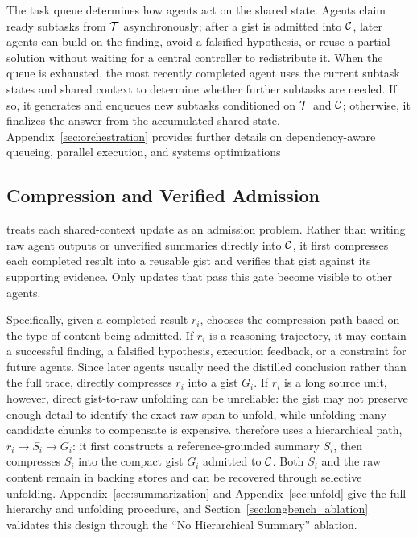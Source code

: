 The task queue determines how agents act on the shared state. Agents claim ready subtasks from $\mathcal{T}$ asynchronously; after a gist is admitted into $\mathcal{C}$, later agents can build on the finding, avoid a falsified hypothesis, or reuse a partial solution without waiting for a central controller to redistribute it. When the queue is exhausted, the most recently completed agent uses the current subtask states and shared context to determine whether further subtasks are needed. If so, it generates and enqueues new subtasks conditioned on $\mathcal{T}$ and $\mathcal{C}$; otherwise, it finalizes the answer from the accumulated shared state. Appendix~\ref{sec:orchestration} provides further details on dependency-aware
queueing, parallel execution, and systems optimizations


\subsection{Compression and Verified Admission}
\label{sec:compression_verification}
\toolName{} treats each shared-context update as an admission problem. Rather than writing raw agent outputs or unverified summaries directly into $\mathcal{C}$, it first compresses each completed result into a reusable gist and verifies that gist against its supporting evidence. Only updates that pass this gate become visible to other agents.

Specifically, given a completed result $r_i$, \toolName{} chooses the compression path based on the type of content being admitted. If $r_i$ is a reasoning trajectory, it may contain a successful finding, a falsified hypothesis, execution feedback, or a constraint for future agents. Since later agents usually need the distilled conclusion rather than the full trace, \toolName{} directly compresses $r_i$ into a gist $G_i$. If $r_i$ is a long source unit, however, direct gist-to-raw unfolding can be unreliable: the gist may not preserve enough detail to identify the exact raw span to unfold, while unfolding many candidate chunks to compensate is expensive. \toolName{} therefore uses a hierarchical path, $r_i \rightarrow S_i \rightarrow G_i$: it first constructs a reference-grounded summary $S_i$, then compresses $S_i$ into the compact gist $G_i$ admitted to $\mathcal{C}$. Both $S_i$ and the raw content remain in backing stores and can be recovered through selective unfolding. Appendix~\ref{sec:summarization} and Appendix~\ref{sec:unfold} give the full hierarchy and unfolding procedure, and Section~\ref{sec:longbench_ablation} validates this design through the ``No Hierarchical Summary'' ablation.


